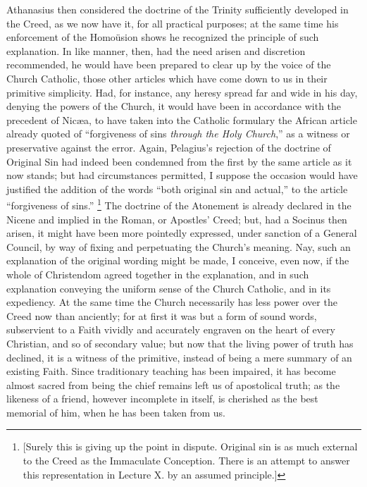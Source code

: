 Athanasius then considered the doctrine of the Trinity sufficiently
developed in the Creed, as we now have it, for all practical purposes;
at the same time his enforcement of the Homoüsion shows he recognized
the principle of such explanation. In like manner, then, had the need
arisen and discretion recommended, he would have been prepared to
clear up by the voice of the Church Catholic, those other articles
which have come down to us in their primitive simplicity. Had, for
instance, any heresy spread far and wide in his day, denying the
powers of the Church, it would have been in accordance with the
precedent of Nicæa, to have taken into the Catholic formulary the
African article already quoted of ``forgiveness of sins \emph{through
the Holy Church},'' as a witness or preservative against the
error. Again, Pelagius's rejection of the doctrine of Original Sin had
indeed been condemned from the first by the same article as it now
stands; but had circumstances permitted, I suppose the occasion would
have justified the addition of the words ``both original sin and
actual,'' to the article ``forgiveness of sins.'' \footnote{[Surely this is giving up the point in
dispute. Original sin is as much external to the Creed as the
Immaculate Conception. There is an attempt to answer this
representation in Lecture X. by an assumed principle.]} The doctrine of the Atonement is already declared in the
Nicene and implied in the Roman, or Apostles' Creed; but, had a Socinus then arisen, it might have been more pointedly expressed,
under sanction of a General Council, by way of fixing and perpetuating
the Church's meaning. Nay, such an explanation of the original wording
might be made, I conceive, even now, if the whole of Christendom
agreed together in the explanation, and in such explanation conveying
the uniform sense of the Church Catholic, and in its expediency. At
the same time the Church necessarily has less power over the Creed now
than anciently; for at first it was but a form of sound words,
subservient to a Faith vividly and accurately engraven on the heart of
every Christian, and so of secondary value; but now that the living
power of truth has declined, it is a witness of the primitive, instead
of being a mere summary of an existing Faith. Since traditionary
teaching has been impaired, it has become almost sacred from being the
chief remains left us of apostolical truth; as the likeness of a
friend, however incomplete in itself, is cherished as the best
memorial of him, when he has been taken from us.

